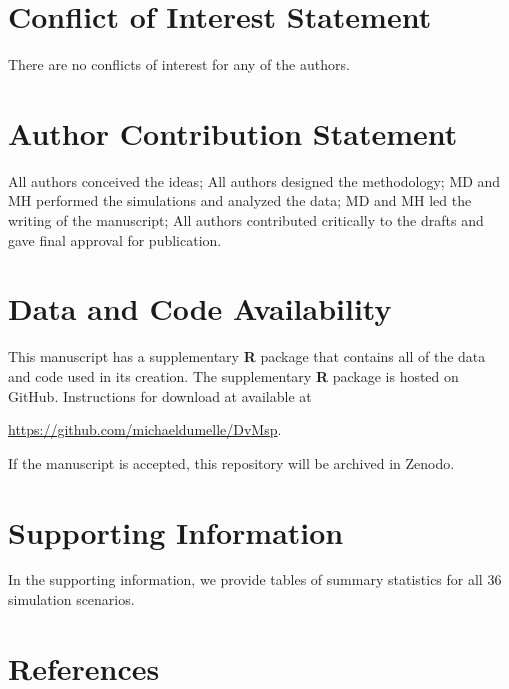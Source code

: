 \documentclass[]{elsarticle} %
\begin{document}
\hypertarget{conflict-of-interest-statement}{%
\section*{Conflict of Interest
Statement}\label{conflict-of-interest-statement}}

There are no conflicts of interest for any of the authors.

\hypertarget{author-contribution-statement}{%
\section*{Author Contribution
Statement}\label{author-contribution-statement}}

All authors conceived the ideas; All authors designed the methodology;
MD and MH performed the simulations and analyzed the data; MD and MH led
the writing of the manuscript; All authors contributed critically to the
drafts and gave final approval for publication.

\hypertarget{data-and-code-availability}{%
\section*{Data and Code Availability}\label{data-and-code-availability}}

This manuscript has a supplementary \textbf{\textsf{R}} package that
contains all of the data and code used in its creation. The
supplementary \textbf{\textsf{R}} package is hosted on GitHub.
Instructions for download at available at

\url{https://github.com/michaeldumelle/DvMsp}.

If the manuscript is accepted, this repository will be archived in
Zenodo.

\hypertarget{supporting-information}{%
\section*{Supporting Information}\label{supporting-information}}

In the supporting information, we provide tables of summary statistics
for all 36 simulation scenarios.

\hypertarget{references}{%
\section*{References}\label{references}}
\end{document}
